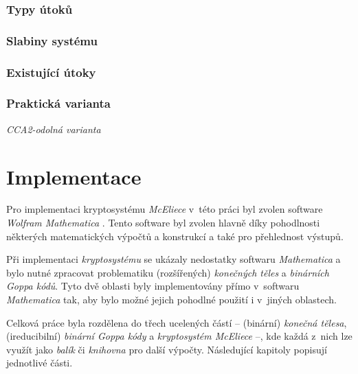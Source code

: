 \documentclass[thesis=M,czech,hidelinks]{FITthesis}[2012/06/26]
\newcommand{\0}{{\textcolor[gray]{0.100}{0}}}
\begin{document}
\subsection{Typy útoků}
\subsection{Slabiny systému}
\subsection{Existující útoky}
\subsection{Praktická varianta}
\emph{CCA2-odolná varianta}





\chapter{Implementace}\label{kap_implementace}
Pro implementaci kryptosystému \emph{McEliece} v~této práci byl zvolen software
\emph{Wolfram Mathematica} \cite{Mathematica}. Tento software byl zvolen hlavně
díky pohodlnosti některých matematických výpočtů a konstrukcí a také pro
přehlednost výstupů. %

Při implementaci \emph{kryptosystému} se ukázaly nedostatky softwaru
\emph{Mathematica} a bylo nutné zpracovat problematiku (rozšířených)
\emph{konečných těles} a \emph{binárních Goppa kódů}. Tyto dvě oblasti byly
implementovány přímo v~softwaru \emph{Mathematica} tak, aby bylo možné jejich
pohodlné použití i v~jiných oblastech.

Celková práce byla rozdělena do třech ucelených částí -- (binární) \emph{konečná
tělesa}, (ireducibilní) \emph{binární Goppa kódy} a \emph{kryptosystém
McEliece} --, kde každá z~nich lze využít jako \emph{balík} či \emph{knihovna}
pro další výpočty. Následující kapitoly popisují jednotlivé části.

\end{document}
